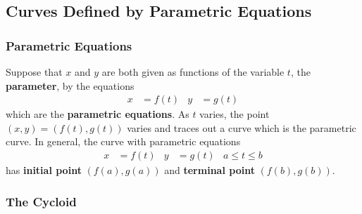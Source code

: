 \subsection{Curves Defined by Parametric Equations}

\subsubsection*{Parametric Equations}
Suppose that \(x\) and \(y\) are both given as functions of the variable
\(t\), the \textbf{parameter}, by the equations
\begin{align*}
    x &= f(t) & y &= g(t)
\end{align*}
which are the \textbf{parametric equations}.
As \(t\) varies, the point \((x,y)=(f(t),g(t))\) varies and traces out a curve
which is the parametric curve.
In general, the curve with parametric equations
\begin{align*}
    x &= f(t) & y &= g(t) & a\leq t\leq b
\end{align*}
has \textbf{initial point} \((f(a),g(a))\) and \textbf{terminal point}
\((f(b),g(b))\).

\subsubsection*{The Cycloid}